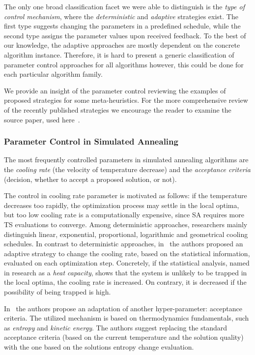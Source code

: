 The only one broad classification facet we were able to distinguish is the \emph{type of control mechanism}, where the \emph{deterministic} and \emph{adaptive} strategies exist. The first type suggests changing the parameters in a predefined schedule, while the second type assigns the parameter values upon received feedback. To the best of our knowledge, the adaptive approaches are mostly dependent on the concrete algorithm instance. Therefore, it is hard to present a generic classification of parameter control approaches for all algorithms however, this could be done for each particular algorithm family.

We provide an insight of the parameter control reviewing the examples of proposed strategies for some meta-heuristics. For the more comprehensive review of the recently published strategies we encourage the reader to examine the source paper, used here~\cite{huang2019survey}.


\subsubsection{Parameter Control in Simulated Annealing}\label{bg: parameter control: SA}
The most frequently controlled parameters in simulated annealing algorithms are the \emph{cooling rate} (the velocity of temperature decrease) and the \emph{acceptance criteria} (decision, whether to accept a proposed solution, or not).

The control in cooling rate parameter is motivated as follows: if the temperature decreases too rapidly, the optimization process may settle in the local optima, but too low cooling rate is a computationally expensive, since SA requires more TS evaluations to converge. Among deterministic approaches, researchers mainly distinguish linear, exponential, proportional, logarithmic and geometrical cooling schedules. In contrast to deterministic approaches, in~\cite{karabin2020simulated} the authors proposed an adaptive strategy to change the cooling rate, based on the statistical information, evaluated on each optimization step. Concretely, if the statistical analysis, named in research as a \emph{heat capacity}, shows that the system is unlikely to be trapped in the local optima, the cooling rate is increased. On contrary, it is decreased if the possibility of being trapped is high.

In~\cite{ghandeshtani2019entropy} the authors propose an adaptation of another hyper-parameter: acceptance criteria. The utilized mechanism is based on thermodynamics fundamentals, such as \emph{entropy} and \emph{kinetic energy}. The authors suggest replacing the standard acceptance criteria (based on the current temperature and the solution quality) with the one based on the solutions entropy change evaluation.

